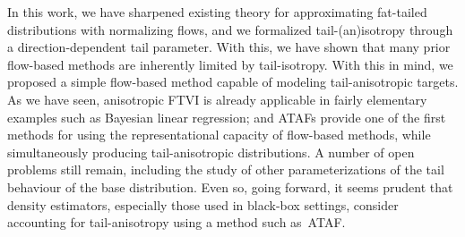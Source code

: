 \documentclass[../../thesis.tex]{subfiles}
\begin{document}
In this work, we have sharpened existing theory for approximating fat-tailed distributions with normalizing flows, and we formalized tail-(an)isotropy through a direction-dependent tail parameter. With this, we have shown that many prior flow-based methods are inherently limited by tail-isotropy. With this in mind, we proposed a simple flow-based method capable of modeling tail-anisotropic targets.
As we have seen, anisotropic FTVI is already applicable in fairly elementary examples such as Bayesian linear regression;
and ATAFs provide one of the first methods for using the representational capacity of flow-based methods,
while simultaneously producing tail-anisotropic distributions. A number of open problems still remain, including the study of other parameterizations of the tail behaviour of the base distribution. Even so, going forward, it seems prudent that density estimators, especially those used in black-box settings, consider accounting for tail-anisotropy using a method such as~ATAF.%




% 
% 

\end{document}
